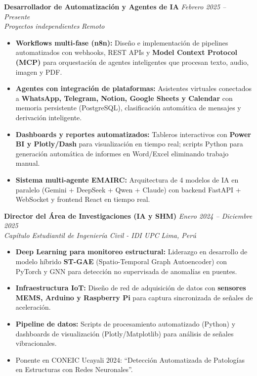 \documentclass[10pt, a4paper]{article}
\newcommand{\entry}[4]{
    \textbf{#1} \hfill \textit{#2} \\
    \textit{#3} \hfill \textit{#4} \\
    \vspace{-1.5mm}
}
\begin{document}
\entry{Desarrollador de Automatización y Agentes de IA}{Febrero 2025 – Presente}{Proyectos independientes}{Remoto}
\begin{itemize}
    \item \textbf{Workflows multi-fase (n8n):} Diseño e implementación de pipelines automatizados con webhooks, REST APIs y \textbf{Model Context Protocol (MCP)} para orquestación de agentes inteligentes que procesan texto, audio, imagen y PDF.
    \item \textbf{Agentes con integración de plataformas:} Asistentes virtuales conectados a \textbf{WhatsApp, Telegram, Notion, Google Sheets y Calendar} con memoria persistente (PostgreSQL), clasificación automática de mensajes y derivación inteligente.
    \item \textbf{Dashboards y reportes automatizados:} Tableros interactivos con \textbf{Power BI y Plotly/Dash} para visualización en tiempo real; scripts Python para generación automática de informes en Word/Excel eliminando trabajo manual.
    \item \textbf{Sistema multi-agente EMAIRC:} Arquitectura de 4 modelos de IA en paralelo (Gemini + DeepSeek + Qwen + Claude) con backend FastAPI + WebSocket y frontend React en tiempo real.
\end{itemize}

\vspace{1mm}

\entry{Director del Área de Investigaciones (IA y SHM)}{Enero 2024 – Diciembre 2025}{Capítulo Estudiantil de Ingeniería Civil - IDI UPC}{Lima, Perú}
\begin{itemize}
    \item \textbf{Deep Learning para monitoreo estructural:} Liderazgo en desarrollo de modelo híbrido \textbf{ST-GAE} (Spatio-Temporal Graph Autoencoder) con PyTorch y GNN para detección no supervisada de anomalías en puentes.
    \item \textbf{Infraestructura IoT:} Diseño de red de adquisición de datos con \textbf{sensores MEMS, Arduino y Raspberry Pi} para captura sincronizada de señales de aceleración.
    \item \textbf{Pipeline de datos:} Scripts de procesamiento automatizado (Python) y dashboards de visualización (Plotly/Matplotlib) para análisis de señales vibracionales.
    \item Ponente en CONEIC Ucayali 2024: ``Detección Automatizada de Patologías en Estructuras con Redes Neuronales''.
\end{itemize}
\end{document}
